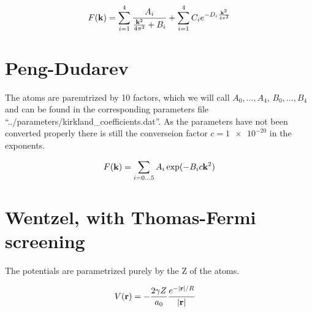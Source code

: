 \documentclass{scrartcl}
\begin{document}
\begin{align}
  F({\bf k}) &= \sum\limits_{i=1}^{4} \frac{A_i}{\frac{{\bf k}^2}{4 \pi^2}+B_i} + \sum\limits_{i=1}^{4} C_i e^{-D_i \frac{{\bf k}^2}{4 \pi^2}} \\
\end{align}

\section{Peng-Dudarev}

The atoms are paremtrized by 10 factors, which we will call \(A_0, ..., A_4\), \(B_0, ..., B_4\) and can be found in the corresponding parameters file ``../parameters/kirkland\_coefficients.dat''.
As the parameters have not been converted properly there is still the converseion factor \(c = \num{1e-20}\) in the exponents.

\begin{align}
  F({\bf k}) = \sum_{i=0...5} A_i\exp(-B_i c {\bf k}^2)
\end{align}

\section{Wentzel, with Thomas-Fermi screening}

The potentials are parametrized purely by the Z of the atoms.

\begin{align}
  V({\bf r}) &= -\frac{2 \gamma Z}{a_0} \frac{e^{-{|{\bf r}|}/{R}}}{|{\bf r}|} 
\end{align}
\end{document}

